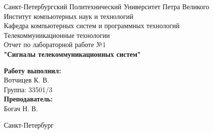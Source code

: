 \documentclass[a4paper]{article}
\begin{document}

\begin{titlepage}	%

	\begin{center}		%

		\large Санкт-Петербургский Политехнический Университет Петра Великого\\
		\large Институт компьютерных наук и технологий \\
		\large Кафедра компьютерных систем и программных технологий\\[6cm]
		
		\huge Телекоммуникационные технологии\\[0.5cm] %
		\large Отчет по лабораторной работе №1 \\[0.1cm]
		\large\textbf{"Сигналы телекоммуникационных систем"}\\[5cm]

	\end{center}


	\begin{flushright} %
		\begin{minipage}{0.25\textwidth} %
			\begin{flushleft} %

				\large\textbf{Работу выполнил:}\\
				\large Вотчицев К. В.\\
				\large {Группа:} 33501/3\\
				
				\large \textbf{Преподаватель:}\\
				\large Богач Н. В.\

			\end{flushleft}
		\end{minipage}
	\end{flushright}
	
	\vfill %

	\begin{center}
	\large Санкт-Петербург\\
	\large \the\year %
	\end{center} %

\thispagestyle{empty} %
\end{titlepage} %
\end{document}
